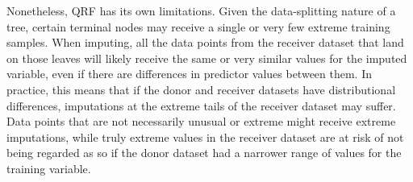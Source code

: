 Nonetheless, QRF has its own limitations. Given the data-splitting nature of a tree, certain terminal nodes may receive a single or very few extreme training samples. When imputing, all the data points from the receiver dataset that land on those leaves will likely receive the same or very similar values for the imputed variable, even if there are differences in predictor values between them. In practice, this means that if the donor and receiver datasets have distributional differences, imputations at the extreme tails of the receiver dataset may suffer. Data points that are not necessarily unusual or extreme might receive extreme imputations, while truly extreme values in the receiver dataset are at risk of not being regarded as so if the donor dataset had a narrower range of values for the training variable.